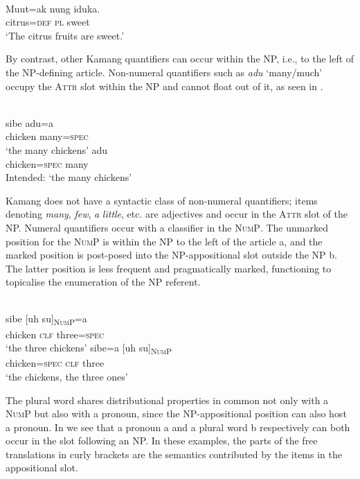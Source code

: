\ea%
\label{ex:9:33}
 \\
\gll  Muut=ak nung iduka. \\
  citrus=\textsc{def} \textsc{pl} sweet   \\
\glt `The citrus fruits are sweet.'
\z






By contrast, other Kamang quantifiers can occur within the NP, i.e., to the left of the NP-defining article. Non-numeral quantifiers such as \textit{adu} `many/much' occupy the \textsc{Attr} slot within the NP and cannot float out of it, as seen in .


\ea%
\label{ex:9:34}
 \\
\ea
\gll sibe adu=a \\
  chicken many=\textsc{spec} \\
\glt `the many chickens' 
\ex
{} {adu} \\
chicken=\textsc{spec} many \\
\glt Intended: `the many chickens'
\z
\z



Kamang does not have a syntactic class of non-numeral quantifiers; items denoting \textit{many}, \textit{few}, \textit{a} \textit{little}, etc. are adjectives and occur in the \textsc{Attr} slot of the NP. Numeral quantifiers occur with a classifier in the \textsc{NumP}. The unmarked position for the \textsc{NumP} is within the NP to the left of the article a, and the marked position is post-posed into the NP-appositional slot outside the NP b. The latter position is less frequent and pragmatically marked, functioning to topicalise the enumeration of the NP referent.


\ea%
\label{ex:9:35}
 \\
\ea
\gll  sibe [{uh}   {su}]\textsc{\textsubscript{NumP}}{=a}\\
  chicken \textsc{clf } three=\textsc{spec} \\
 \glt `the three chickens' 
\ex
\gll sibe=a [uh su]\textsc{\textsubscript{NumP}} \\
 chicken=\textsc{spec} \textsc{clf} three  \\
\glt `the chickens, the three ones'
\z
\z


The plural word shares distributional properties in common not only with a \textsc{NumP} but also with a pronoun, since the NP-appositional position can also host a pronoun. In  we see that a pronoun a and a plural word b respectively can both occur in the slot following an NP. In these examples, the parts of the free translations in curly brackets are the semantics contributed by the items in the appositional slot.


